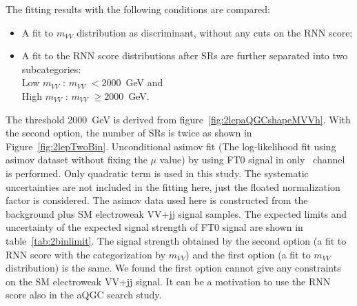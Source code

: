 The fitting results with the following conditions are compared:
\begin{itemize}
  \item A fit to $m_{VV}$ distribution as discriminant, without any cuts on the RNN score;
  \item A fit to the RNN score distributions after
        SRs are further separated into two subcategories: \\
        Low $m_{VV}$ : $m_{VV}$ $< 2000$~GeV and \\
        High $m_{VV}$ : $m_{VV}$ $\geq 2000$~GeV. \\
\end{itemize}
The threshold 2000~GeV is derived from figure~\ref{fig:2lepaQGCshapeMVVh}.
With the second option, the number of SRs is twice as shown in Figure~\ref{fig:2lepTwoBin}.
Unconditional asimov fit (The log-likelihood fit using asimov dataset without fixing the $\mu$ value) by using FT0 signal in only \tlep\ channel is performed.
Only quadratic term is used in this study.
The systematic uncertainties are not included in the fitting here, just the floated normalization factor is considered.
The asimov data used here is constructed from the background plus SM electroweak VV+jj signal samples.
The expected limits and uncertainty of the expected signal strength of FT0 signal are shown in table~\ref{tab:2binlimit}.
The signal strength obtained by the second option (a fit to RNN score with the categorization by $m_{VV}$) and the first option (a fit to $m_{VV}$ distribution) is the same. 
We found the first option cannot give any constraints on the SM electroweak VV+jj signal.
It can be a motivation to use the RNN score also in the aQGC search study.

